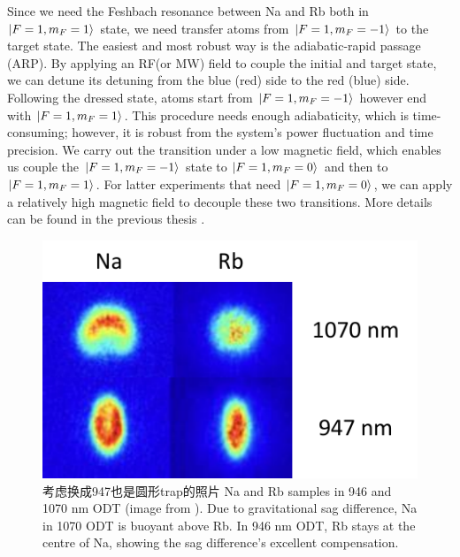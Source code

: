 Since we need the Feshbach resonance between Na and Rb both in  $\ket{F=1,m_F=1}$ state, we need transfer atoms from $\ket{F=1,m_F=-1}$ to the target state. The easiest and most robust way is the adiabatic-rapid passage (ARP). By applying an RF(or MW) field to couple the initial and target state, we can detune its detuning from the blue (red) side to the red (blue) side. Following the dressed state, atoms start from $\ket{F=1,m_F=-1}$ however end with $\ket{F=1,m_F=1}$. This procedure needs enough adiabaticity, which is time-consuming; however, it is robust from the system's power fluctuation and time precision. We carry out the transition under a low magnetic field, which enables us couple the $\ket{F=1,m_F=-1}$ state to $\ket{F=1,m_F=0}$ and then to $\ket{F=1,m_F=1}$. For latter experiments that need $\ket{F=1,m_F=0}$, we can apply a relatively high magnetic field to decouple these two transitions. More details can be found in the previous thesis \cite{WangFudong2016Soau,LiXiaoke2015Chsd,LiLintao2021}.

\begin{figure}[htb]
\begin{center}
\includegraphics[width = 0.6\linewidth]{figures/OT_1070-946.pdf}
\end{center}
\caption[Na and Rb samples in 946 and 1070 nm ODT (image from \cite{LiLintao2021})]{考虑换成947也是圆形trap的照片 Na and Rb samples in 946 and 1070 nm ODT (image from \cite{LiLintao2021}). Due to gravitational sag difference, Na in 1070 ODT is buoyant above Rb. In 946 nm ODT, Rb stays at the centre of Na, showing the sag difference's excellent compensation.}
\label{OT_1070-946}
\end{figure}

